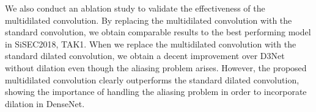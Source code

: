 \documentclass[final]{cvpr}
\begin{document}
We also conduct an ablation study to validate the effectiveness of the multidilated convolution. By replacing the multidilated convolution with the standard convolution, we obtain comparable results to the best performing model in SiSEC2018, TAK1. When we replace the multidilated convolution with the standard dilated convolution, we obtain a decent improvement over D3Net without dilation even though the aliasing problem arises. However, the proposed multidilated convolution clearly outperforms the standard dilated convolution, showing the importance of handling the aliasing problem in order to incorporate dilation in DenseNet. 
\end{document}
